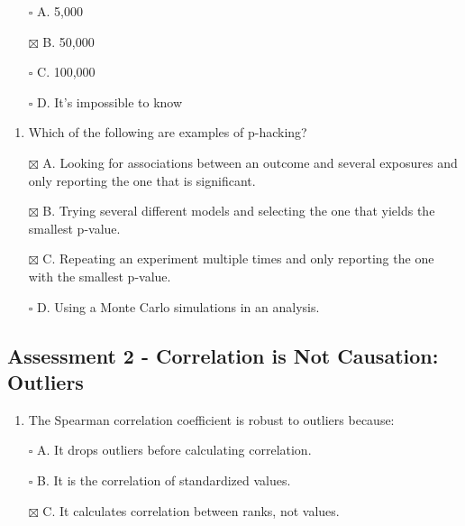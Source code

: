 \documentclass[
]{article}
\providecommand{\tightlist}{%
  \setlength{\itemsep}{0pt}\setlength{\parskip}{0pt}}
\begin{document}
\begin{itemize}
\tightlist
\item[$\square$]
  A. 5,000
\item[$\boxtimes$]
  B. 50,000
\item[$\square$]
  C. 100,000
\item[$\square$]
  D. It's impossible to know
\end{itemize}

\begin{enumerate}
\def\labelenumi{\arabic{enumi}.}
\setcounter{enumi}{1}
\tightlist
\item
  Which of the following are examples of p-hacking?
\end{enumerate}

\begin{itemize}
\tightlist
\item[$\boxtimes$]
  A. Looking for associations between an outcome and several exposures
  and only reporting the one that is significant.
\item[$\boxtimes$]
  B. Trying several different models and selecting the one that yields
  the smallest p-value.
\item[$\boxtimes$]
  C. Repeating an experiment multiple times and only reporting the one
  with the smallest p-value.
\item[$\square$]
  D. Using a Monte Carlo simulations in an analysis.
\end{itemize}

\hypertarget{assessment-2---correlation-is-not-causation-outliers}{%
\subsection{Assessment 2 - Correlation is Not Causation:
Outliers}\label{assessment-2---correlation-is-not-causation-outliers}}

\begin{enumerate}
\def\labelenumi{\arabic{enumi}.}
\tightlist
\item
  The Spearman correlation coefficient is robust to outliers because:
\end{enumerate}

\begin{itemize}
\tightlist
\item[$\square$]
  A. It drops outliers before calculating correlation.
\item[$\square$]
  B. It is the correlation of standardized values.
\item[$\boxtimes$]
  C. It calculates correlation between ranks, not values.
\end{itemize}
\end{document}
